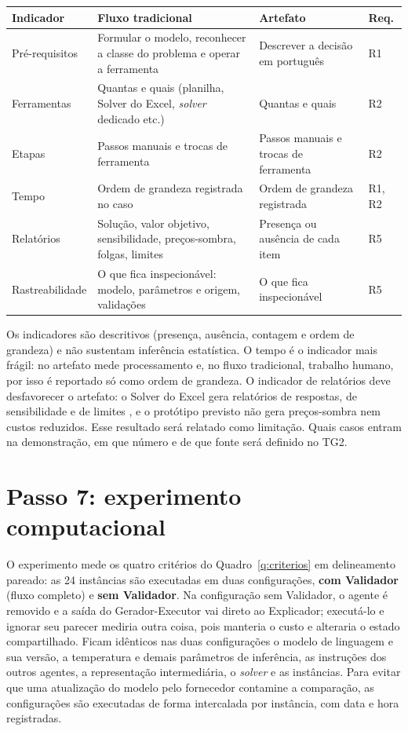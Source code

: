 \begin{quadro}[htbp]
\caption{Indicadores da demonstração comparada}
\label{q:indicadores}
\centering
\small
\begin{tabularx}{\textwidth}{@{}l X X l@{}}
\toprule
Indicador & Fluxo tradicional & Artefato & Req. \\
\midrule
Pré-requisitos & Formular o modelo, reconhecer a classe do problema e operar a ferramenta & Descrever a decisão em português & R1 \\
Ferramentas & Quantas e quais (planilha, Solver do Excel, \textit{solver} dedicado etc.) & Quantas e quais & R2 \\
Etapas & Passos manuais e trocas de ferramenta & Passos manuais e trocas de ferramenta & R2 \\
Tempo & Ordem de grandeza registrada no caso & Ordem de grandeza registrada & R1, R2 \\
Relatórios & Solução, valor objetivo, sensibilidade, preços-sombra, folgas, limites & Presença ou ausência de cada item & R5 \\
Rastreabilidade & O que fica inspecionável: modelo, parâmetros e origem, validações & O que fica inspecionável & R5 \\
\bottomrule
\end{tabularx}
\end{quadro}

Os indicadores são descritivos (presença, ausência, contagem e ordem de grandeza) e não sustentam inferência estatística. O tempo é o indicador mais frágil: no artefato mede processamento e, no fluxo tradicional, trabalho humano, por isso é reportado só como ordem de grandeza. O indicador de relatórios deve desfavorecer o artefato: o Solver do Excel gera relatórios de respostas, de sensibilidade e de limites \cite{frontlinesystems2024}, e o protótipo previsto não gera preços-sombra nem custos reduzidos. Esse resultado será relatado como limitação. Quais casos entram na demonstração, em que número e de que fonte será definido no TG2.

\section{Passo 7: experimento computacional}
\label{sec:experimento}

O experimento mede os quatro critérios do Quadro~\ref{q:criterios} em delineamento pareado: as 24 instâncias são executadas em duas configurações, \textbf{com Validador} (fluxo completo) e \textbf{sem Validador}. Na configuração sem Validador, o agente é removido e a saída do Gerador-Executor vai direto ao Explicador; executá-lo e ignorar seu parecer mediria outra coisa, pois manteria o custo e alteraria o estado compartilhado. Ficam idênticos nas duas configurações o modelo de linguagem e sua versão, a temperatura e demais parâmetros de inferência, as instruções dos outros agentes, a representação intermediária, o \textit{solver} e as instâncias. Para evitar que uma atualização do modelo pelo fornecedor contamine a comparação, as configurações são executadas de forma intercalada por instância, com data e hora registradas.

